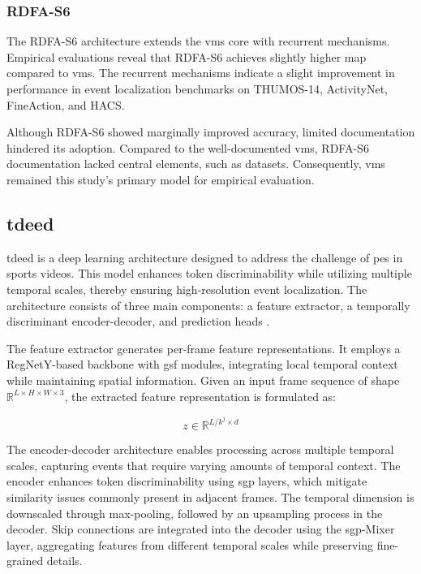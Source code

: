 \subsubsection{RDFA-S6}
The RDFA-S6 architecture extends the \acrshort{vms} core with recurrent mechanisms. Empirical evaluations reveal that RDFA-S6 achieves slightly higher \acrlong{map} compared to \acrshort{vms}. The recurrent mechanisms indicate a slight improvement in performance in event localization benchmarks on THUMOS-14, ActivityNet, FineAction, and HACS. 

Although RDFA-S6 showed marginally improved accuracy, limited documentation hindered its adoption. Compared to the well-documented \acrlong{vms}, RDFA-S6 documentation lacked central elements, such as datasets. Consequently, \acrshort{vms} remained this study's primary model for empirical evaluation. 


\subsection{\acrfull{tdeed}}
\label{ssec:tdeed}

\acrfull{tdeed} is a deep learning architecture designed to address the challenge of \acrfull{pes} in sports videos. This model enhances token discriminability while utilizing multiple temporal scales, thereby ensuring high-resolution event localization. The architecture consists of three main components: a feature extractor, a temporally discriminant encoder-decoder, and prediction heads \cite{xarles_t-deed_2024}.

The feature extractor generates per-frame feature representations. It employs a RegNetY-based backbone with \acrfull{gsf} modules, integrating local temporal context while maintaining spatial information. Given an input frame sequence of shape \(\mathbb{R}^{L \times H \times W \times 3}\), the extracted feature representation is formulated as:

\[
z \in \mathbb{R}^{L/{k^j \times d} }
\]

The encoder-decoder architecture enables processing across multiple temporal scales, capturing events that require varying amounts of temporal context. The encoder enhances token discriminability using \acrfull{sgp} layers, which mitigate similarity issues commonly present in adjacent frames. The temporal dimension is downscaled through max-pooling, followed by an upsampling process in the decoder. Skip connections are integrated into the decoder using the \acrshort{sgp}-Mixer layer, aggregating features from different temporal scales while preserving fine-grained details.

